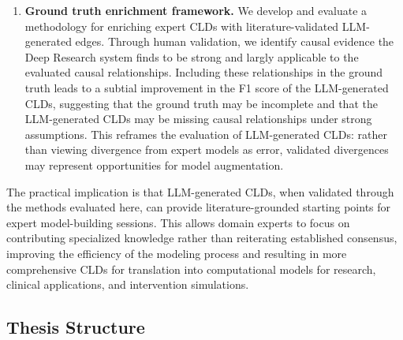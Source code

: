 \begin{enumerate}
    \item \textbf{Ground truth enrichment framework.} We develop and evaluate a methodology for enriching expert CLDs with literature-validated LLM-generated edges. Through human validation, we identify causal evidence the Deep Research system finds to be strong and largly applicable to the evaluated causal relationships.
    Including these relationships in the ground truth leads to a subtial improvement in the F1 score of the LLM-generated CLDs, suggesting that the ground truth may be incomplete and that the LLM-generated CLDs may be missing causal relationships under strong assumptions. This reframes the evaluation of LLM-generated CLDs: rather than viewing divergence from expert models as error, validated divergences may represent opportunities for model augmentation.
\end{enumerate}

The practical implication is that LLM-generated CLDs, when validated through the methods evaluated here, can provide literature-grounded starting points for expert model-building sessions. This allows domain experts to focus on contributing specialized knowledge rather than reiterating established consensus, improving the efficiency of the modeling process and resulting in more comprehensive CLDs for translation into computational models for research, clinical applications, and intervention simulations.

\subsection*{Thesis Structure}

